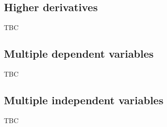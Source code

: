 
\subsection{Higher derivatives}
TBC

\subsection{Multiple dependent variables}
TBC

\subsection{Multiple independent variables}
TBC
